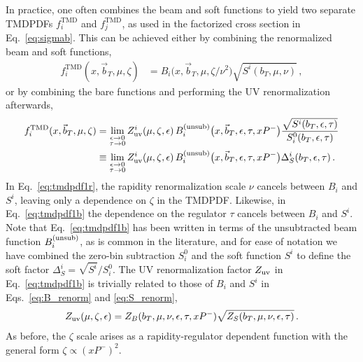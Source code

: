 \documentclass[11pt,a4paper]{article}
\DeclareRobustCommand{\eq}[1]{Eq.~\eqref{eq:#1}}
\DeclareRobustCommand{\eqs}[2]{Eqs.~\eqref{eq:#1} and \eqref{eq:#2}}
\newcommand{\eps}{\epsilon}
\newcommand{\nn}{\nonumber}
\newcommand\TMD{\mathrm{TMD}}
\newcommand{\bt}{\vec b_T}
\newcommand{\unsub}{{\rm(unsub)}}
\begin{document}
In practice, one often combines the beam and soft functions to yield two separate TMDPDFs $f^\TMD_i$ and $f^\TMD_j$,
as used in the factorized cross section in \eq{sigmab}.
This can be achieved either by combining the renormalized beam and soft functions,
\begin{align}
 \label{eq:tmdpdf1r}
 f^\TMD_{i}(x, \bt, \mu , \zeta)
 &= B_{i}\bigl(x, \bt, \mu, \zeta/\nu^2\bigr) \sqrt{S^i(b_T,\mu,\nu)}
\,,\end{align}
or by combining the bare functions and performing the UV renormalization afterwards,
\begin{align} \label{eq:tmdpdf1b}
 f^\TMD_{i}(x, \bt, \mu , \zeta) &
 =  \lim_{\substack{\epsilon\to 0 \\ \tau\to 0}} Z_{\rm uv}^i(\mu,\zeta,\epsilon)\, B_{i}^\unsub\bigl(x, \bt, \epsilon, \tau, x P^- \bigr) \frac{\sqrt{S^i(b_T,\epsilon,\tau)}}{S^0_i(b_T,\eps,\tau)}
 \nn\\&
 \equiv \lim_{\substack{\epsilon\to 0 \\ \tau\to 0}} Z_{\rm uv}^i(\mu,\zeta,\epsilon)\, B_{i}^\unsub\bigl(x, \bt, \epsilon, \tau, x P^- \bigr) \Delta_S^i(b_T,\epsilon,\tau)
\,.\end{align}
In \eq{tmdpdf1r}, the rapidity renormalization scale $\nu$ cancels between $B_i$ and $S^i$, leaving only a dependence on $\zeta$ in the TMDPDF.
Likewise, in \eq{tmdpdf1b} the dependence on the regulator $\tau$ cancels between $B_i$ and $S^i$.
Note that \eq{tmdpdf1b} has been written in terms of the unsubtracted beam function $B_i^\unsub$, as is common in the literature, and for ease of notation we have combined the zero-bin subtraction $S_i^0$ and the soft function $S^i$ to define the soft factor $\Delta_S^i = \sqrt{S^i} / S_i^0$.
The UV renormalization factor $Z_{\rm uv}$ in \eq{tmdpdf1b} is trivially related to those of $B_i$ and $S^i$ in \eqs{B_renorm}{S_renorm},
\begin{align} \label{eq:Z_uv_eta}
 Z_{\rm uv}(\mu, \zeta, \eps) = Z_B(b_T, \mu, \nu, \eps, \tau, x P^-) \sqrt{Z_S(b_T, \mu, \nu, \eps, \tau)}
\,.\end{align}
As before, the $\zeta$ scale arises as a rapidity-regulator dependent function with the general form $\zeta \propto (x P^-)^2$.
\end{document}
